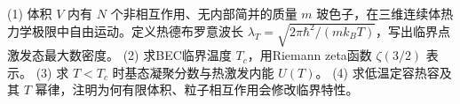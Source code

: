 (1) 体积 \(V\) 内有 \(N\) 个非相互作用、无内部简并的质量 \(m\) 玻色子，在三维连续体热力学极限中自由运动。定义热德布罗意波长 \(\lambda_T=\sqrt{2\pi\hbar^2/(mk_BT)}\)，写出临界点激发态最大数密度。
(2) 求BEC临界温度 \(T_c\)，用Riemann zeta函数 \(\zeta(3/2)\) 表示。
(3) 求 \(T<T_c\) 时基态凝聚分数与热激发内能 \(U(T)\)。
(4) 求低温定容热容及其 \(T\) 幂律，注明为何有限体积、粒子相互作用会修改临界特性。
